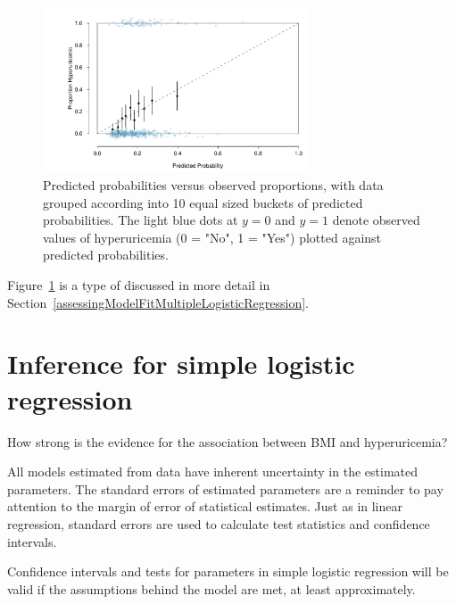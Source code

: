 \begin{figure}[!tbh]
  \centering
  \includegraphics[width=0.70\textwidth]
  {ch_logistic_regression_oi_biostat/figures/predVsObsHuBMI/predVsObsHuBMI.pdf}
    \caption{Predicted probabilities versus observed proportions, with data grouped according into 10 equal sized buckets of predicted probabilities. The light blue dots at  $y = 0$ and $y = 1$ denote observed values of hyperuricemia (0 = "No", 1 = "Yes") plotted against predicted probabilities.}
    \label{figure:predVsObsHuBMI}
\end{figure}

Figure~\ref{figure:predVsObsHuBMI} is a type of  discussed in more detail in Section~\ref{assessingModelFitMultipleLogisticRegression}.




\section{Inference for simple logistic regression} \label{inferenceSimpleLogisticRegression}

How strong is the evidence for the association between BMI and hyperuricemia?

All models estimated from data have inherent uncertainty in the estimated parameters.  The standard errors of estimated parameters are a reminder to pay attention to the margin of error of statistical estimates.  Just as in linear regression, standard errors are used to calculate test statistics and confidence intervals.

Confidence intervals and tests for parameters in simple logistic regression will be valid if the assumptions behind the model are met, at least approximately.



